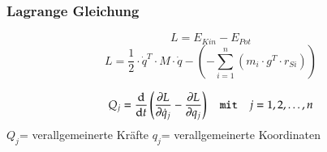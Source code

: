 \begin{minipage}{\linewidth}
    \begin{minipage}{0.5\linewidth}
        \subsubsection{Lagrange Gleichung}
        \vspace{-0.5cm}
        \[ L=E_{Kin}-E_{Pot} \]
        \[ L= \frac{1}{2}\cdot \dot{q}^T \cdot M \cdot \dot{q} -(- \sum_{i=1}^{n}(m_i \cdot g^T \cdot r_{Si})) \]
    \end{minipage}
    \begin{minipage}{0.5\linewidth}
        \[ Q_j = \frac{\mathop{}\!\mathrm{d}}{\mathop{}\!\mathrm{d} t} \left(\frac{\partial L}{\partial \dot{q}_j} - \frac{\partial L}{\partial q_j}\right) \quad \texttt{mit}\quad j=1,2,\dots, n\]
        $Q_j$= verallgemeinerte Kräfte\newline
        $q_j$= verallgemeinerte Koordinaten
    \end{minipage}
\end{minipage}


